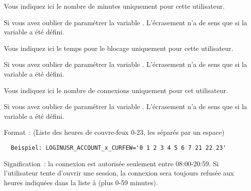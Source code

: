 \begin{description}



  Vous indiquez ici le nombre de minutes uniquement pour cette utilisateur.

  Si vous avez oublier de paramétrer la variable .
  L'écrasement n'a de sens que si la variable 
  a été défini.



   Vous indiquez ici le temps pour le blocage uniquement pour cette utilisateur.

  Si vous avez oublier de paramétrer la variable .
  L'écrasement n'a de sens que si la variable 
  a été défini.



  Vous indiquez ici le nombre de connexions uniquement pour cet utilisateur. 

  Si vous avez oublier de paramétrer la variable .
  L'écrasement n'a de sens que si la variable 
  a été défini.



   Format~: (Liste des heures de couvre-feux 0-23, les séparés par un espace)
  \begin{example}
  \begin{verbatim}
  Beispiel: LOGINUSR_ACCOUNT_x_CURFEW='0 1 2 3 4 5 6 7 21 22 23'
  \end{verbatim}
  \end{example}
  Signification~: la connexion est autorisée seulement entre 08:00-20:59.
  Si l'utilisateur tente d'ouvrir une session, la connexion sera toujours
  refusée aux heures indiquées dans la liste à (plus 0-59 minutes).


\end{description}
